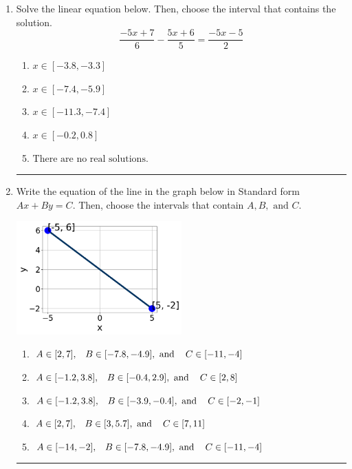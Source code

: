 \documentclass[14pt]{extbook}
\newcommand{\litem}[1]{\item#1\hspace*{-1cm}\rule{\textwidth}{0.4pt}}
\begin{document}
\begin{enumerate}
{\begin{enumerate}[label=\Alph*.]
\end{enumerate} }
\litem{
Solve the linear equation below. Then, choose the interval that contains the solution.\[ \frac{-5x + 7}{6} - \frac{5x + 6}{5} = \frac{-5x -5}{2} \]\begin{enumerate}[label=\Alph*.]
\item \( x \in [-3.8, -3.3] \)
\item \( x \in [-7.4, -5.9] \)
\item \( x \in [-11.3, -7.4] \)
\item \( x \in [-0.2, 0.8] \)
\item \( \text{There are no real solutions.} \)

\end{enumerate} }
\litem{
Write the equation of the line in the graph below in Standard form $Ax+By=C$. Then, choose the intervals that contain $A, B, \text{ and } C$.
\begin{center}
    \includegraphics[width=0.5\textwidth]{../Figures/linearGraphToStandardCopyA.png}
\end{center}
\begin{enumerate}[label=\Alph*.]
\item \( A \in [2, 7], \hspace{3mm} B \in [-7.8, -4.9], \text{ and } \hspace{3mm} C \in [-11, -4] \)
\item \( A \in [-1.2, 3.8], \hspace{3mm} B \in [-0.4, 2.9], \text{ and } \hspace{3mm} C \in [2, 8] \)
\item \( A \in [-1.2, 3.8], \hspace{3mm} B \in [-3.9, -0.4], \text{ and } \hspace{3mm} C \in [-2, -1] \)
\item \( A \in [2, 7], \hspace{3mm} B \in [3, 5.7], \text{ and } \hspace{3mm} C \in [7, 11] \)
\item \( A \in [-14, -2], \hspace{3mm} B \in [-7.8, -4.9], \text{ and } \hspace{3mm} C \in [-11, -4] \)

\end{enumerate} }
\end{enumerate}
\end{document}
